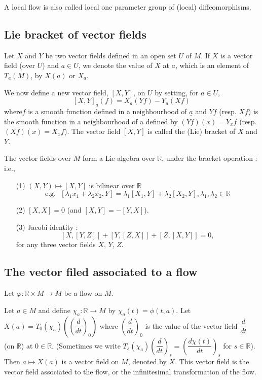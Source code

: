 A local flow is also called local one parameter group of (local) diffeomorphisms.

\subsection*{Lie bracket of vector fields}

Let $X$ and $Y$ be two vector fields defined in an open set $U$ of $M$. If $X$ is a vector field (over $U$) and $a\in U$, we denote the value of $X$ at $a$, which is an element of $T_{a}(M)$, by $X(a)$ or $X_{a}$.

We now define a new vector field, $[X,Y]$, on $U$ by setting, for $a\in U$,
$$
[X,Y]_{a}(f)=X_{a}(Yf)-Y_{a}(Xf)
$$
where\pageoriginale $f$ is a smooth function defined in a neighbourhood of $\underline{a}$ and $Yf$ (resp. $Xf$) is the smooth function in a neighbourhood of a defined by $(Yf)(x)=Y_{x}f$ (resp. $(Xf)(x)=X_{x}f$). The vector field $[X,Y]$ is called the (Lie) bracket of $X$ and $Y$.

The vector fields over $M$ form a Lie algebra over $\mathbb{R}$, under the bracket operation : i.e.,
\begin{itemize}
\item[(1)] $(X,Y)\mapsto [X,Y]$ is bilinear over $\mathbb{R}$
$$
\text{e.g.~ } [\lambda_{1}x_{1}+\lambda_{2}x_{2},Y]=\lambda_{1}[X_{1},Y]+\lambda_{2}[X_{2},Y],\lambda_{1},\lambda_{2}\in \mathbb{R}
$$

\item[(2)] $[X,X]=0$ (and $[X,Y]=-[Y,X]$).

\item[(3)] Jacobi identity :
$$
[X,[Y,Z]]+[Y,[Z,X]]+[Z,[X,Y]]=0,
$$
for any three vector fields $X$, $Y$, $Z$.
\end{itemize}

\subsection*{The vector filed associated to a flow}

Let $\varphi:\mathbb{R}\times M\to M$ be a flow on $M$.

Let $a\in M$ and define $\chi_{a}:\mathbb{R}\to M$ by $\chi_{a}(t)=\phi(t,a)$. Let $X(a)=T_{0}(\chi_{a})\left(\left(\dfrac{d}{dt}\right)_{0}\right)$ where $\left(\dfrac{d}{dt}\right)_{0}$ is the value of the vector field $\dfrac{d}{dt}$ (on $\mathbb{R}$) at $0\in \mathbb{R}$. (Sometimes we write $T_{s}(\chi_{a})\left(\dfrac{d}{dt}\right)_{s}=\left(\dfrac{d\chi(t)}{dt}\right)_{s}$ for $s\in \mathbb{R}$). Then $a\mapsto X(a)$ is a vector field on $M$, denoted by $X$. This vector field is the vector field associated to the flow, or the infinitesimal transformation of the flow.

